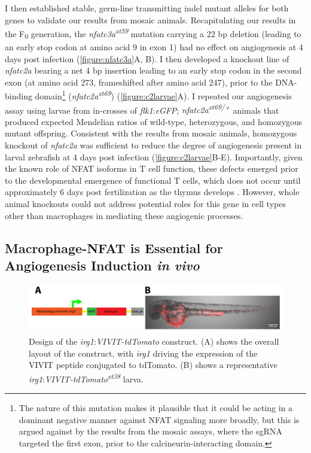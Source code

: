 I then established stable, germ-line transmitting indel mutant alleles for both genes to validate our results from mosaic animals. Recapitulating our results in the F\textsubscript{0} generation, the \textit{nfatc3a\textsuperscript{xt59}} mutation carrying a 22 bp deletion (leading to an early stop codon at amino acid 9 in exon 1) had no effect on angiogenesis at 4 days post infection (\autoref{figure:nfatc3a}A, B). I then developed a knockout line of \textit{nfatc2a} bearing a net 4 bp insertion leading to an early stop codon in the second exon (at amino acid 273, frameshifted after amino acid 247), prior to the DNA\hyp{}binding domain\footnote{The nature of this mutation makes it plausible that it could be acting in a dominant negative manner against NFAT signaling more broadly, but this is argued against by the results from the mosaic assays, where the sgRNA targeted the first exon, prior to the calcineurin-interacting domain.} (\textit{nfatc2a\textsuperscript{xt69}}) (\autoref{figure:c2larvae}A). I repeated our angiogenesis assay using larvae from in-crosses of \textit{flk1}:\textit{eGFP}; \textit{nfatc2a\textsuperscript{xt69/+}} animals that produced expected Mendelian ratios of wild\hyp{}type, heterozygous, and homozygous mutant offspring. Consistent with the results from mosaic animals, homozygous knockout of \textit{nfatc2a} was sufficient to reduce the degree of angiogenesis present in larval zebrafish at 4 days post infection (\autoref{figure:c2larvae}B\hyp{}E). Importantly, given the known role of NFAT isoforms in T cell function, these defects emerged prior to the developmental emergence of functional T cells, which does not occur until approximately 6 days post fertilization as the thymus develops \citep{Trede2004}. However, whole animal knockouts could not address potential roles for this gene in cell types other than macrophages in mediating these angiogenic processes. 

\subsection{Macrophage\hyp{}NFAT is Essential for Angiogenesis Induction \textit{in vivo}}

\begin{figure}
\centering
\includegraphics[width=\textwidth]{images/vivitconstruct.pdf}
\caption[Design of \textit{irg1}:\textit{VIVIT\hyp{}tdTomato}]{Design of the \textit{irg1}:\textit{VIVIT\hyp{}tdTomato} construct. (A) shows the overall layout of the construct, with \textit{irg1} driving the expression of the VIVIT peptide conjugated to tdTomato. (B) shows a representative \textit{irg1}:\textit{VIVIT\hyp{}tdTomato\textsuperscript{xt38}} larva.}
\label{figure:vivitdiagram}
\end{figure}

